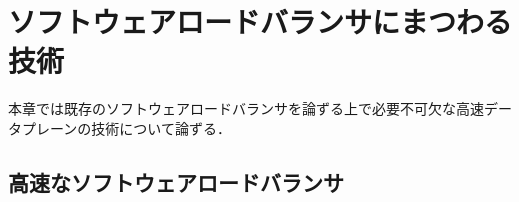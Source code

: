 \chapter{ソフトウェアロードバランサにまつわる技術}
\label{related}
本章では既存のソフトウェアロードバランサを論ずる上で必要不可欠な高速データプレーンの技術について論ずる．






\section{高速なソフトウェアロードバランサ}
\label{related:rapidlb}





